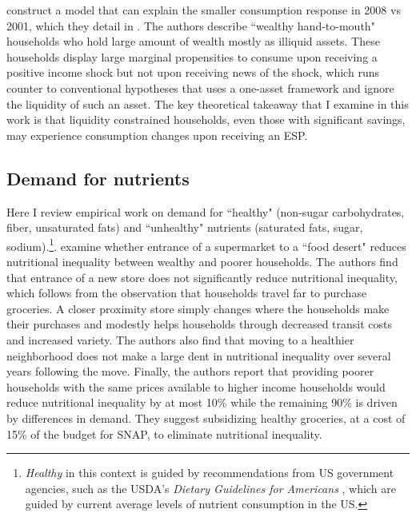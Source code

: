\documentclass[12pt]{article}
\begin{document}
\textcite{kaplan2014model} construct a model that can explain the smaller consumption response in 2008 vs 2001, which they detail in \textcite{kaplan2014tale}. The authors describe ``wealthy hand-to-mouth" households who hold large amount of wealth mostly as illiquid assets. These households display large marginal propensities to consume upon receiving a positive income shock but not upon receiving news of the shock, which runs counter to conventional hypotheses that uses a one-asset framework and ignore the liquidity of such an asset. The key theoretical takeaway that I examine in this work is that liquidity constrained households, even those with significant savings, may experience consumption changes upon receiving an ESP.

\subsection{Demand for nutrients}

Here I review empirical work on demand for ``healthy" (non-sugar carbohydrates, fiber, unsaturated fats) and ``unhealthy" nutrients (saturated fats, sugar, sodium).\footnote{\textit{Healthy} in this context is guided by recommendations from US government agencies, such as the USDA's \textit{Dietary Guidelines for Americans} \citeyear{usda2021}, which are guided by current average levels of nutrient consumption in the US.}. \textcite{allcott2019food} examine whether entrance of a supermarket to a ``food desert" reduces nutritional inequality between wealthy and poorer households. The authors find that entrance of a new store does not significantly reduce nutritional inequality, which follows from the observation that households travel far to purchase groceries. A closer proximity store simply changes where the households make their purchases and modestly helps households through decreased transit costs and increased variety. The authors also find that moving to a healthier neighborhood does not make a large dent in nutritional inequality over several years following the move. Finally, the authors report that providing poorer households with the same prices available to higher income households would reduce nutritional inequality by at most 10\% while the remaining 90\% is driven by differences in demand. They suggest subsidizing healthy groceries, at a cost of 15\% of the budget for SNAP, to eliminate nutritional inequality.
\end{document}
